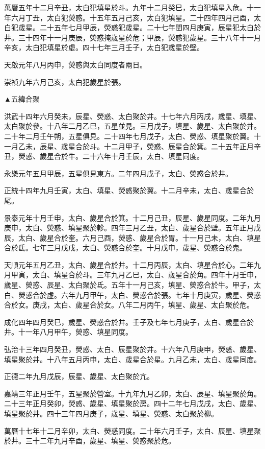 \begin{pinyinscope}
萬曆五年十二月辛丑，太白犯填星於斗。九年十二月癸巳，太白犯填星入危。十一年六月丁丑，太白犯熒惑。十五年五月己亥，太白犯填星。二十四年四月己酉，太白犯歲星。二十五年七月甲辰，熒惑犯歲星。二十七年閏四月庚寅，辰星犯太白於井。三十四年十一月庚辰，熒惑掩歲星於危；甲辰，熒惑犯歲星。三十八年十一月辛亥，太白犯填星於虛。四十七年三月壬子，太白犯歲星於壁。

天啟元年八月丙申，熒惑與太白同度者兩日。

崇禎九年六月己亥，太白犯歲星於張。

▲五緯合聚

洪武十四年六月癸未，辰星、熒惑、太白聚於井。十七年六月丙戌，歲星、填星、太白聚於參。十八年二月乙巳，五星並見。三月戊子，填星、歲星、太白聚於井。二十年二月壬午朔，五星俱見。二十四年七月戊子，太白、熒惑、填星聚於翼。十一月乙未，辰星、歲星合於斗。十二月甲子，熒惑、辰星合於箕。二十五年正月辛丑，熒惑、歲星合於牛。二十六年十月壬辰，太白、填星同度。

永樂元年五月甲辰，五星俱見東方。二年四月戊子，太白、熒惑合於井。

正統十四年九月壬寅，太白、填星、熒惑聚於翼。十二月辛未，太白、歲星合於尾。

景泰元年十月壬申，太白、歲星合於箕。十二月己丑，辰星、歲星同度。二年九月庚申，太白、熒惑、填星聚於軫。四年三月乙丑，太白、歲星合於壁。五年正月戊辰，太白、歲星合於奎。六月己酉，熒惑、歲星合於胃。十一月己未，太白、填星合於氐。七年三月戊戌，太白、熒惑合於奎。十月戊申，歲星、熒惑合於鬼。

天順元年五月乙丑，太白、歲星合於井。十二月丙辰，太白、填星合於心。二年九月甲寅，太白、填星合於斗。三年九月乙巳，太白、歲星合於角。四年十月壬申，歲星、熒惑、辰星、太白聚於氐。五年十一月己亥，填星、熒惑合於牛。甲子，太白、熒惑合於虛。六年九月甲午，太白、熒惑合於張。七年十月庚寅，歲星、熒惑合於女。庚戌，太白、歲星合於女。八年二月丙午，填星、歲星、太白聚於危。

成化四年四月癸巳，歲星、熒惑合於井。壬子及七年七月庚子，太白、歲星合於井。十一年八月甲午，熒惑、填星同度。

弘治十三年四月癸丑，熒惑、太白、辰星聚於井。十六年八月庚申，熒惑、歲星、填星聚於井。十八年五月丙申，太白、歲星合於星。九月乙未，太白、歲星同度。

正德二年九月戊辰，辰星、歲星、太白聚於亢。

嘉靖三年正月壬午，五星聚於營室。十九年九月乙卯，太白、辰星、填星聚於角。二十三年正月癸卯，熒惑、歲星、填星聚於房。四十二年七月戊戌，太白、歲星、填星聚於井。四十三年四月庚子，歲星、填星、熒惑、太白聚於柳。

萬曆十七年十二月辛卯，太白、熒惑同度。二十年六月壬子，太白、辰星、填星聚於井。三十二年九月辛酉，歲星、填星、熒惑聚於危。


\end{pinyinscope}
